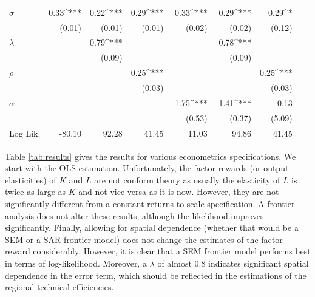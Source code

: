 \documentclass[11pt,parskip,abstracton,notitlepage]{scrartcl}
\begin{document}
\begin{table}[h]
\begin{tabular*}{\columnwidth}{@{\extracolsep{\fill}}l D{.}{.}{3.5}@{} D{.}{.}{2.5}@{} D{.}{.}{2.5}@{} D{.}{.}{2.5}@{} D{.}{.}{2.5}@{} D{.}{.}{2.5}@{} }
	$\sigma$          & 0.33^{***} & 0.22^{***} & 0.29^{***} & 0.33^{***}  & 0.29^{***}  & 0.29^{*}   \\
	& (0.01)     & (0.01)     & (0.01)     & (0.02)      & (0.02)      & (0.12)     \\
	$\lambda$         &            & 0.79^{***} &            &             & 0.78^{***}  &            \\
	&            & (0.09)     &            &             & (0.09)      &            \\
	$\rho$            &            &            & 0.25^{***} &             &             & 0.25^{***} \\
	&            &            & (0.03)     &             &             & (0.03)     \\
	$\alpha$          &            &            &            & -1.75^{***} & -1.41^{***} & -0.13      \\
	&            &            &            & (0.53)      & (0.37)      & (5.09)     \\
	\midrule
	Log Lik.          & -80.10     & 92.28      & 41.45      & 11.03       & 94.86       & 41.45      \\
	\bottomrule
\end{tabular*}
\end{table}
%
Table \ref{tab:results} gives the results for various econometrics specifications. We start with the OLS estimation. Unfortunately, the factor rewards (or output elasticities) of $K$ and $L$ are not conform theory as usually the elasticity of $L$ is twice as large as $K$ and not vice-versa as it is now. However, they are not significantly different from a constant returns to scale specification. A frontier analysis does not alter these results, although the likelihood improves significantly. Finally, allowing for spatial dependence (whether that would be a SEM or a SAR frontier model) does not change the estimates of the factor reward considerably. However, it is clear that a SEM frontier model performs best in terms of log-likelihood. Moreover, a $\lambda$ of almost 0.8 indicates significant spatial dependence in the error term, which should be reflected in the estimations of the regional technical efficiencies.
\end{document}
